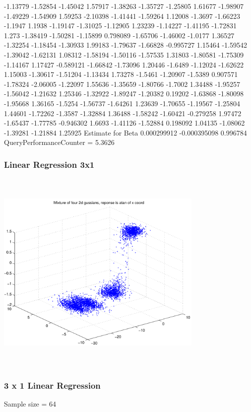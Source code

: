 \documentclass[9pt]{article}
\theoremstyle{plain}
\theoremstyle{definition}
\theoremstyle{remark}
\numberwithin{equation}{section}
\begin{document}
-1.13779
-1.52854
-1.45042
1.57917
-1.38263
-1.35727
-1.25805
1.61677
-1.98907
-1.49229
-1.54909
1.59253
-2.10398
-1.41441
-1.59264
1.12008
-1.3697
-1.66223
-1.1947
1.1938
-1.19147
-1.31025
-1.12905
1.23239
-1.14227
-1.41195
-1.72831
1.273
-1.38419
-1.50281
-1.15899
0.798089
-1.65706
-1.46002
-1.0177
1.36527
-1.32254
-1.18454
-1.30933
1.99183
-1.79637
-1.66828
-0.995727
1.15464
-1.59542
-1.39042
-1.62131
1.08312
-1.58194
-1.50116
-1.57535
1.31803
-1.80581
-1.75309
-1.14167
1.17427
-0.589121
-1.66842
-1.73096
1.20446
-1.6489
-1.12024
-1.62622
1.15003
-1.30617
-1.51204
-1.13434
1.73278
-1.5461
-1.20907
-1.5389
0.907571
-1.78324
-2.06005
-1.22097
1.55636
-1.35659
-1.80766
-1.7002
1.34488
-1.95257
-1.56042
-1.21632
1.25346
-1.32922
-1.89247
-1.20382
0.19202
-1.63868
-1.80098
-1.95668
1.36165
-1.5254
-1.56737
-1.64261
1.23639
-1.70655
-1.19567
-1.25804
1.44601
-1.72262
-1.3587
-1.32884
1.36488
-1.58242
-1.60421
-0.279258
1.97472
-1.65437
-1.77785
-0.946302
1.6693
-1.41126
-1.52884
0.198092
1.04135
-1.08062
-1.39281
-1.21884
1.25925
Estimate for Beta
0.000299912
-0.000395098
0.996784
QueryPerformanceCounter  =  5.3626
\subsubsection{Linear Regression 3x1}
\includegraphics[width=10.0cm,height=10.0cm]{AtanDataSet.pdf}

\subsubsection{3 x 1 Linear Regression}
Sample size = 64
\end{document}
